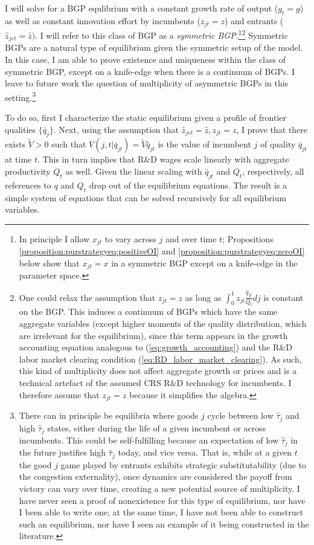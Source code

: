 \documentclass[11pt,english]{article}
\begin{document}
I will solve for a BGP equlibrium with a constant growth rate of output ($g_t = g$) as well as constant innovation effort by incumbents ($z_{jt} = z$) and entrants ($\hat{z}_{jet} = \hat{z})$. I will refer to this class of BGP as a \textit{symmetric BGP}.\footnote{In principle I allow $x_{jt}$ to vary across $j$ and over time $t$; Propositions \ref{proposition:purstrategyeq:positiveOI} and \ref{proposition:purstrategyeq:zeroOI} below show that $x_{jt} = x$ in a symmetric BGP except on a knife-edge in the parameter space.}\footnote{One could relax the assumption that $z_{jt} = z$ as long as $\int_0^1 z_{jt} \frac{\bar{q}_{jt}}{Q_t}dj$ is constant on the BGP. This induces a continuum of BGPs which have the same aggregate variables (except higher moments of the quality distribution, which are irrelevant for the equilibrium), since this term appears in the growth accounting equation analogous to (\ref{eq:growth_accounting}) and the R\&D labor market clearing condition (\ref{eq:RD_labor_market_clearing}). As such, this kind of multiplicity does not affect aggregate growth or prices and is a technical artefact of the assumed CRS R\&D technology for incumbents. I therefore assume that $z_{jt} = z$ because it simplifies the algebra.} Symmetric BGPs are a natural type of equilibrium given the symmetric setup of the model. In this case, I am able to prove existence and uniqueness within the class of symmetric BGP, except on a knife-edge when there is a continuum of BGPs. I leave to future work the question of multiplicity of asymmetric BGPs in this setting.\footnote{There can in principle be equilibria where goods $j$ cycle between low $\hat{\tau}_{j}$ and high $\hat{\tau}_{j}$ states, either during the life of a given incumbent or across incumbents. This could be self-fulfilling because an expectation of low $\hat{\tau}_j$ in the future justifies high $\hat{\tau}_j$ today, and vice versa. That is, while at a given $t$ the good $j$ game played by entrants exhibits strategic substitutability (due to the congestion externality), once dynamics are considered the payoff from victory can vary over time, creating a new potential source of multiplicity. I have never seen a proof of nonexistence for this type of equilibrium, nor have I been able to write one; at the same time, I have not been able to construct such an equilibrium, nor have I seen an example of it being constructed in the literature.} 

To do so, first I characterize the static equilibrium given a profile of frontier qualities $\{ \bar{q}_{j}\}$. Next, using the assumption that $\hat{z}_{jet} = \hat{z}, z_{jt} = z$, I prove that there exists $\tilde{V} > 0$ such that $V(j,t|\bar{q}_{jt}) = \tilde{V} \bar{q}_{jt}$ is the value of incumbent $j$ of quality $\bar{q}_{jt}$ at time $t$. This in turn implies that R\&D wages scale linearly with aggregate productivity $Q_t$ as well. Given the linear scaling with $\bar{q}_{jt}$ and $Q_t$, respectively, all references to $q$ and $Q_t$ drop out of the equilibrium equations. The result is a simple system of equations that can be solved recursively for all equilibrium variables. 
\end{document}
